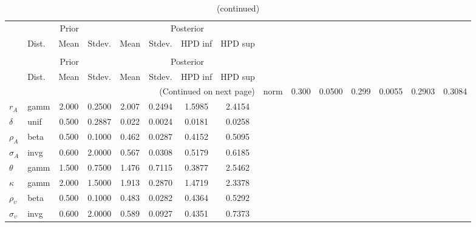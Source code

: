  
\begin{center}
\begin{longtable}{llcccccc} 
\caption{Results from Metropolis-Hastings (parameters)}
 \label{Table:MHPosterior:1}\\
\toprule 
  & \multicolumn{3}{c}{Prior}  &  \multicolumn{4}{c}{Posterior} \\
  \cmidrule(r{.75em}){2-4} \cmidrule(r{.75em}){5-8}
  & Dist. & Mean  & Stdev. & Mean & Stdev. & HPD inf & HPD sup\\
\midrule \endfirsthead 
\caption{(continued)}\\\toprule 
  & \multicolumn{3}{c}{Prior}  &  \multicolumn{4}{c}{Posterior} \\
  \cmidrule(r{.75em}){2-4} \cmidrule(r{.75em}){5-8}
  & Dist. & Mean  & Stdev. & Mean & Stdev. & HPD inf & HPD sup\\
\midrule \endhead 
\bottomrule \multicolumn{8}{r}{(Continued on next page)} \endfoot 
\bottomrule \endlastfoot 
${\alpha}$ & norm &   0.300 & 0.0500 &   0.299& 0.0055 &  0.2903 &  0.3084 \\ 
${r_{A}}$ & gamm &   2.000 & 0.2500 &   2.007& 0.2494 &  1.5985 &  2.4154 \\ 
${\delta}$ & unif &   0.500 & 0.2887 &   0.022& 0.0024 &  0.0181 &  0.0258 \\ 
${\rho_A}$ & beta &   0.500 & 0.1000 &   0.462& 0.0287 &  0.4152 &  0.5095 \\ 
${\sigma_A}$ & invg &   0.600 & 2.0000 &   0.567& 0.0308 &  0.5179 &  0.6185 \\ 
${\theta}$ & gamm &   1.500 & 0.7500 &   1.476& 0.7115 &  0.3877 &  2.5462 \\ 
${\kappa}$ & gamm &   2.000 & 1.5000 &   1.913& 0.2870 &  1.4719 &  2.3378 \\ 
${\rho_\upsilon}$ & beta &   0.500 & 0.1000 &   0.483& 0.0282 &  0.4364 &  0.5292 \\ 
${\sigma_\upsilon}$ & invg &   0.600 & 2.0000 &   0.589& 0.0927 &  0.4351 &  0.7373 \\ 
\end{longtable}
 \end{center}
